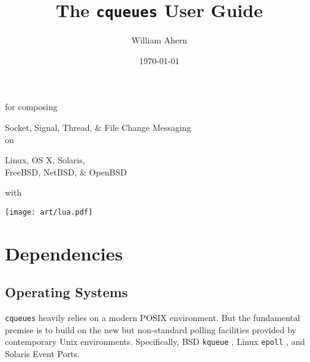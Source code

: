 \documentclass[11pt, oneside]{memoir}
\newcommand{\cqueues}[0]{\texttt{cqueues} }
\newcommand{\syscall}[1]{\texttt{#1} }
\begin{document}

\title{
\HUGE\sffamily The \cqueues User Guide
}

\vspace*{10pt}
\LARGE for composing \\
\vspace*{10pt}

\HUGE Socket, Signal, Thread, \& File Change Messaging \\


\vspace*{10pt}
\LARGE on \\
\vspace*{10pt}

\HUGE Linux, OS X, Solaris, \\ FreeBSD, NetBSD, \& OpenBSD

\vspace*{10pt}
\LARGE with \\
\vspace*{10pt}

{\texttt{[image: art/lua.pdf]}}

\vspace*{30pt}

\date{\today}
\author{William Ahern}
\maketitle
\thispagestyle{empty}
\clearpage

\setcounter{page}{1}
\tableofcontents

\clearpage

\setcounter{page}{1}


\chapter{Dependencies}

\section{Operating Systems}

\cqueues heavily relies on a modern POSIX environment. But the fundamental premise is to build on the new but non-standard polling facilities provided by contemporary Unix environments. Specifically, BSD \syscall{kqueue}, Linux \syscall{epoll}, and Solaris Event Ports.
\end{document}
